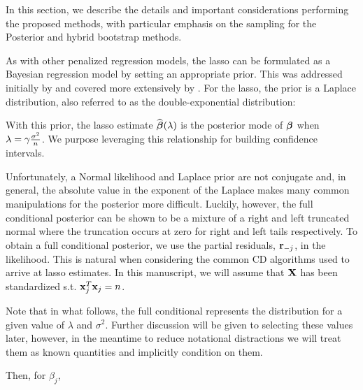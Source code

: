 In this section, we describe the details and important considerations performing the proposed methods, with particular emphasis on the sampling for the Posterior and hybrid bootstrap methods.

As with other penalized regression models, the lasso can be formulated as a Bayesian regression model by setting an appropriate prior. This was addressed initially by \cite{Tibshirani1996} and covered more extensively by \cite{Park2008}. For the lasso, the prior is a Laplace distribution, also referred to as the double-exponential distribution:


With this prior, the lasso estimate $\widehat{\boldsymbol{\beta}}(\lambda)$ is the posterior mode of $\boldsymbol{\beta}$ when $\lambda = \gamma \frac{\sigma^2}{n}$. We purpose leveraging this relationship for building confidence intervals.

Unfortunately, a Normal likelihood and Laplace prior are not conjugate and, in general, the absolute value in the exponent of the Laplace makes many common manipulations for the posterior more difficult. Luckily, however, the full conditional posterior can be shown to be a mixture of a right and left truncated normal where the truncation occurs at zero for right and left tails respectively. To obtain a full conditional posterior, we use the partial residuals, $\mathbf{r}_{-j}$, in the likelihood. This is natural when considering the common CD algorithms used to arrive at lasso estimates. In this manuscript, we will assume that $\mathbf{X}$ has been standardized s.t. $\mathbf{x}_j^T\mathbf{x}_j = n$.

Note that in what follows, the full conditional represents the distribution for a given value of $\lambda$ and $\sigma^2$. Further discussion will be given to selecting these values later, however, in the meantime to reduce notational distractions we will treat them as known quantities and implicitly condition on them.

Then, for $\beta_j$,


